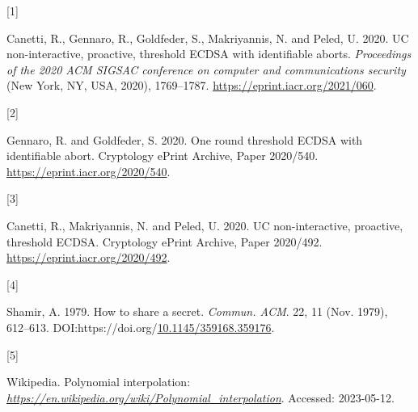 \documentclass[
]{article}
\newlength{\cslhangindent}
\newlength{\csllabelwidth}
\newlength{\cslentryspacingunit} %
\newenvironment{CSLReferences}[2] %
 {%
  \setlength{\parindent}{0pt}
  \ifodd #1
  \let\oldpar\par
  \def\par{\hangindent=\cslhangindent\oldpar}
  \fi
  \setlength{\parskip}{#2\cslentryspacingunit}
 }%
 {}
\newcommand{\CSLLeftMargin}[1]{\parbox[t]{\csllabelwidth}{#1}}
\newcommand{\CSLRightInline}[1]{\parbox[t]{\linewidth - \csllabelwidth}{#1}\break}
\begin{document}
\hypertarget{refs}{}
\begin{CSLReferences}{0}{0}
\leavevmode{}%
\CSLLeftMargin{{[}1{]} }%
\CSLRightInline{Canetti, R., Gennaro, R., Goldfeder, S., Makriyannis, N.
and Peled, U. 2020. UC non-interactive, proactive, threshold ECDSA with
identifiable aborts. \emph{Proceedings of the 2020 ACM SIGSAC conference
on computer and communications security} (New York, NY, USA, 2020),
1769--1787. \url{https://eprint.iacr.org/2021/060}.}

\leavevmode{}%
\CSLLeftMargin{{[}2{]} }%
\CSLRightInline{Gennaro, R. and Goldfeder, S. 2020. One round threshold
ECDSA with identifiable abort. Cryptology ePrint Archive, Paper
2020/540. \url{https://eprint.iacr.org/2020/540}.}

\leavevmode{}%
\CSLLeftMargin{{[}3{]} }%
\CSLRightInline{Canetti, R., Makriyannis, N. and Peled, U. 2020. UC
non-interactive, proactive, threshold ECDSA. Cryptology ePrint Archive,
Paper 2020/492. \url{https://eprint.iacr.org/2020/492}.}

\leavevmode{}%
\CSLLeftMargin{{[}4{]} }%
\CSLRightInline{Shamir, A. 1979. How to share a secret. \emph{Commun.
ACM}. 22, 11 (Nov. 1979), 612--613.
DOI:https://doi.org/\href{https://doi.org/10.1145/359168.359176}{10.1145/359168.359176}.}

\leavevmode{}%
\CSLLeftMargin{{[}5{]} }%
\CSLRightInline{Wikipedia. Polynomial interpolation:
\href{https://en.wikipedia.org/wiki/Polynomial_interpolation}{\emph{https://en.wikipedia.org/wiki/Polynomial\_interpolation}}.
Accessed: 2023-05-12.}

\end{CSLReferences}
\end{document}

